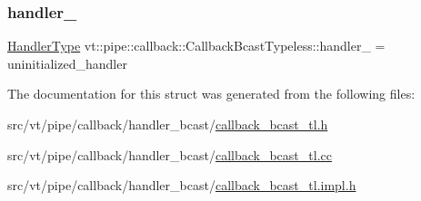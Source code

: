 \subsubsection{\texorpdfstring{handler\+\_\+}{handler\_}}
{\footnotesize\ttfamily \hyperlink{namespacevt_af64846b57dfcaf104da3ef6967917573}{Handler\+Type} vt\+::pipe\+::callback\+::\+Callback\+Bcast\+Typeless\+::handler\+\_\+ = uninitialized\+\_\+handler\hspace{0.3cm}{\ttfamily [private]}}



The documentation for this struct was generated from the following files\+:\begin{DoxyCompactItemize}
\item 
src/vt/pipe/callback/handler\+\_\+bcast/\hyperlink{callback__bcast__tl_8h}{callback\+\_\+bcast\+\_\+tl.\+h}\item 
src/vt/pipe/callback/handler\+\_\+bcast/\hyperlink{callback__bcast__tl_8cc}{callback\+\_\+bcast\+\_\+tl.\+cc}\item 
src/vt/pipe/callback/handler\+\_\+bcast/\hyperlink{callback__bcast__tl_8impl_8h}{callback\+\_\+bcast\+\_\+tl.\+impl.\+h}\end{DoxyCompactItemize}
